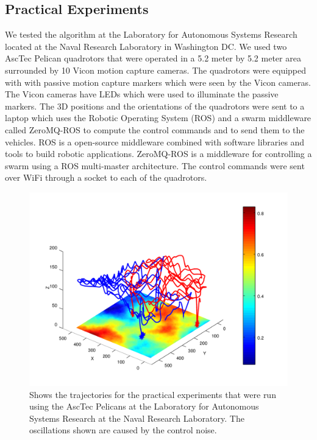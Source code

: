 \documentclass{article}
\begin{document}
\subsection{Practical Experiments}

We tested the algorithm at the Laboratory for Autonomous Systems Research
located at the Naval Research Laboratory in Washington DC\@. We used two AscTec
Pelican quadrotors that were operated in a 5.2 meter by 5.2 meter area
surrounded by 10 Vicon motion capture cameras. The quadrotors were equipped
with with passive motion capture markers which were seen by the Vicon cameras.
The Vicon cameras have LEDs which were used to illuminate the passive markers.
The 3D positions and the orientations of the quadrotors were sent to a laptop
which uses the Robotic Operating System (ROS) and a swarm middleware called
ZeroMQ-ROS to compute the control commands and to send them to the vehicles.
ROS is a open-source middleware combined with software libraries and tools to
build robotic applications. ZeroMQ-ROS is a middleware for controlling a swarm
using a ROS multi-master architecture. The control commands were sent over WiFi
through a socket to each of the quadrotors.

\begin{figure}[ht]

    \centering
    \includegraphics[width=1\columnwidth]{tasefigs/trajpractical.png}

    \caption{Shows the trajectories for the practical experiments that were
        run using the AscTec Pelicans at the Laboratory for Autonomous Systems
    Research at the Naval Research Laboratory. The oscillations shown are
    caused by the control noise.}

\end{figure}

 
\end{document}
